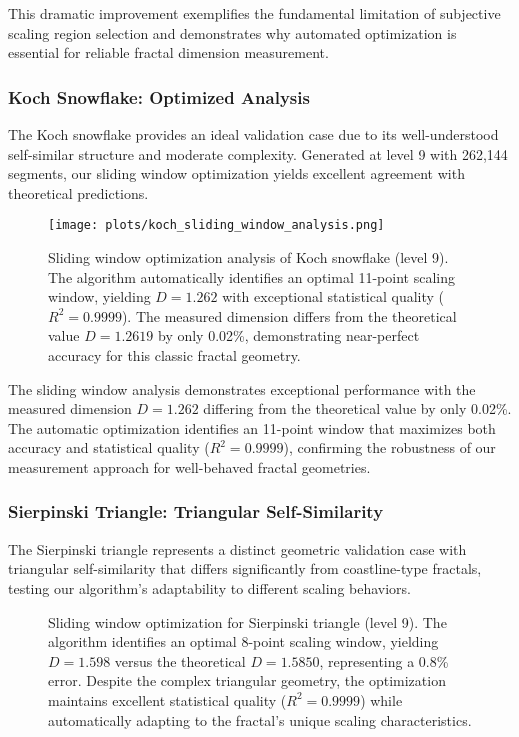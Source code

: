 \documentclass[preprint,12pt]{elsarticle}
\begin{document}
This dramatic improvement exemplifies the fundamental limitation of subjective scaling region selection and demonstrates why automated optimization is essential for reliable fractal dimension measurement.

\subsubsection{Koch Snowflake: Optimized Analysis}

The Koch snowflake provides an ideal validation case due to its well-understood self-similar structure and moderate complexity. Generated at level 9 with 262,144 segments, our sliding window optimization yields excellent agreement with theoretical predictions.

\begin{figure}[ht]
\centering
\texttt{[image: plots/koch\_sliding\_window\_analysis.png]}
\caption{Sliding window optimization analysis of Koch snowflake (level 9). The algorithm automatically identifies an optimal 11-point scaling window, yielding $D = 1.262$ with exceptional statistical quality ($R^2 = 0.9999$). The measured dimension differs from the theoretical value $D = 1.2619$ by only 0.02\%, demonstrating near-perfect accuracy for this classic fractal geometry.}
\label{fig:koch_optimized}
\end{figure}

The sliding window analysis demonstrates exceptional performance with the measured dimension $D = 1.262$ differing from the theoretical value by only 0.02\%. The automatic optimization identifies an 11-point window that maximizes both accuracy and statistical quality ($R^2 = 0.9999$), confirming the robustness of our measurement approach for well-behaved fractal geometries.

\subsubsection{Sierpinski Triangle: Triangular Self-Similarity}

The Sierpinski triangle represents a distinct geometric validation case with triangular self-similarity that differs significantly from coastline-type fractals, testing our algorithm's adaptability to different scaling behaviors.

\begin{figure}[ht]
\centering
\caption{Sliding window optimization for Sierpinski triangle (level 9). The algorithm identifies an optimal 8-point scaling window, yielding $D = 1.598$ versus the theoretical $D = 1.5850$, representing a 0.8\% error. Despite the complex triangular geometry, the optimization maintains excellent statistical quality ($R^2 = 0.9999$) while automatically adapting to the fractal's unique scaling characteristics.}
\label{fig:sierpinski_optimized}
\end{figure}
\end{document}
